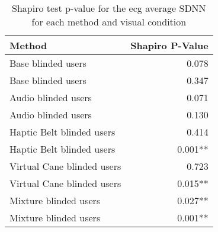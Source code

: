 
\begin{table}[!htb]
\centering
\caption{Shapiro test p-value for the ecg average SDNN for each method and visual condition}
\label{tab:shapiro_ecg_sdnn}
\begin{tabular}{lr}
\toprule
                    Method & Shapiro P-Value \\
\midrule
        Base blinded users &           0.078 \\
        Base blinded users &           0.347 \\
       Audio blinded users &           0.071 \\
       Audio blinded users &           0.130 \\
 Haptic Belt blinded users &           0.414 \\
 Haptic Belt blinded users &         0.001** \\
Virtual Cane blinded users &           0.723 \\
Virtual Cane blinded users &         0.015** \\
     Mixture blinded users &         0.027** \\
     Mixture blinded users &         0.001** \\
\bottomrule
\end{tabular}
\end{table}

